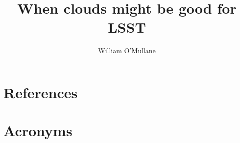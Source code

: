 \documentclass[DM,authoryear,toc]{lsstdoc}
\title{When  clouds might be good  for LSST}
\author{%
William O'Mullane
}
\date{\vcsDate}
\begin{document}
\maketitle


\appendix
\section{References} \label{sec:bib}


\section{Acronyms} \label{sec:acronyms}

\end{document}

